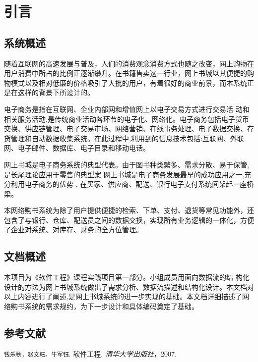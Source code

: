 \chapter{引言}
\section{系统概述}
随着互联网的高速发展与普及，人们的消费观念消费方式也随之改变，网上购物在用户消费中所占的比例正逐渐攀升。在书籍售卖这一行业，网上书城以其便捷的购物模式以及相对低廉的价格吸引了大批的用户，有着很好的商业前景，而本系统正是在这样的背景下所设计的。

电子商务是指在互联网、企业内部网和增值网上以电子交易方式进行交易活 动和相关服务活动,是传统商业活动各环节的电子化、网络化。电子商务包括电子货币交换、供应链管理、电子交易市场、网络营销、在线事务处理、电子数据交换、存货管理和自动数据收集系统。在此过程中,利用到的信息技术包括:互联网、外联网、电子邮件、数据库、电子目录和移动电话。

网上书城是电子商务系统的典型代表。由于图书种类繁多、需求分散、易于保管,是长尾理论应用于零售的典型案 网上书城是电子商务发展最早的成功应用之一,充分利用电子商务的优势 , 在买家、供应商、配送、银行电子支付系统间架起一座桥梁。

本网络购书系统为除了用户提供便捷的检索、下单、支付、退货等常见功能外，还包含了与银行、仓库、配送员之间的数据交换，实现所有业务逻辑的一体化，方便了企业对系统、对库存、财务的全方位管理。
\section{文档概述}
本项目为《软件工程》课程实践项目第一部分。小组成员用面向数据流的结 构化设计的方法为网上书城系统做出了需求分析、数据流描述和结构化设计。本文档对以上内容进行了阐述,是网上书城系统的进一步实现的基础。本文档详细描述了网络购书系统的需求规约，为下一步设计和具体编码奠定了基础。
\section{参考文献}
\texttt{钱乐秋，赵文耘，牛军钰}.  软件工程.  	\textit{清华大学出版社}，2007.